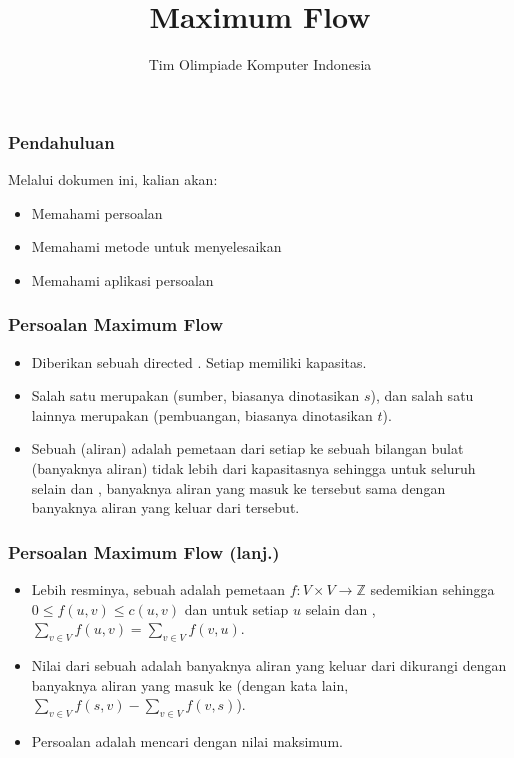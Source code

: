

\title{Maximum Flow}
\author{Tim Olimpiade Komputer Indonesia}
\date{}



\begin{frame}
\titlepage
\end{frame}

\begin{frame}
\frametitle{Pendahuluan}
Melalui dokumen ini, kalian akan:
\begin{itemize}
  \item Memahami persoalan \fmaxflow
  \item Memahami metode untuk menyelesaikan \fmaxflow
  \item Memahami aplikasi persoalan \fmaxflow
\end{itemize}
\end{frame}

\begin{frame}
\frametitle{Persoalan Maximum Flow}
\begin{itemize}
  \item Diberikan sebuah directed \fgraph. Setiap \fedge memiliki kapasitas.
  \item Salah satu \fnode merupakan  (sumber, biasanya dinotasikan \fnode $s$), dan salah satu \fnode lainnya merupakan  (pembuangan, biasanya dinotasikan \fnode $t$).
  \item Sebuah  (aliran) adalah pemetaan dari setiap \fedge ke sebuah bilangan bulat (banyaknya aliran) tidak lebih dari kapasitasnya sehingga untuk seluruh \fnode selain \fsource dan \fsink, banyaknya aliran yang masuk ke \fnode tersebut sama dengan banyaknya aliran yang keluar dari \fnode tersebut.
\end{itemize}
\end{frame}

\begin{frame}
\frametitle{Persoalan Maximum Flow (lanj.)}
\begin{itemize}
  \item Lebih resminya, sebuah \fflow adalah pemetaan $f : V \times V \rightarrow \mathbb{Z}$ sedemikian sehingga $0 \le f(u, v) \le c(u, v)$ dan untuk setiap \fnode $u$ selain \fsource dan \fsink, $\sum_{v \in V} f(u, v) = \sum_{v \in V} f(v, u)$.
  \item Nilai dari sebuah \fflow adalah banyaknya aliran yang keluar dari \fsource dikurangi dengan banyaknya aliran yang masuk ke \fsource (dengan kata lain, $\sum_{v \in V} f(s, v) - \sum_{v \in V} f(v, s)$).
  \item Persoalan  adalah mencari \fflow dengan nilai maksimum.
\end{itemize}
\end{frame}

